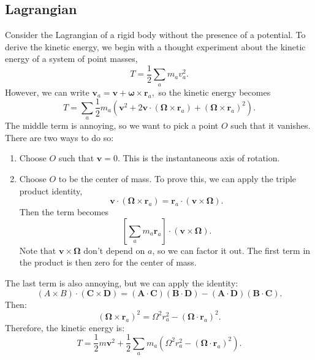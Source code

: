 \documentclass{article}
\numberwithin{equation}{section}
\begin{document}
\subsection{Lagrangian}
Consider the Lagrangian of a rigid body without the presence of a potential. To derive the kinetic energy, we begin with a thought experiment about the kinetic energy of a system of point masses,
\begin{equation}
    T = \frac{1}{2}\sum_a m_av_a^2.
\end{equation}
However, we can write $\bm{v}_a = \bm{v} + \bm{\omega} \times \bm{r}_a,$ so the kinetic energy becomes
\begin{equation}
    T = \sum_a \frac{1}{2}m_a\left(\bm{v}^2 + 2\bm{v}\cdot (\bm{\Omega} \times \bm{r}_a) + (\bm{\Omega} \times \bm{r}_a)^2\right).
\end{equation}
The middle term is annoying, so we want to pick a point $O$ such that it vanishes. There are two ways to do so:
\begin{enumerate}
    \item Choose $O$ such that $\bm{v}=0.$ This is the instantaneous axis of rotation.
    \item Choose $O$ to be the center of mass. To prove this, we can apply the triple product identity,
    \begin{equation}
        \bm{v} \cdot (\bm{\Omega} \times \bm{r}_a) = \bm{r}_a \cdot (\bm{v} \times \bm{\Omega}).
    \end{equation}
    Then the term becomes
    \begin{equation}
        \left[\sum_a m_a \bm{r}_a\right] \cdot (\bm{v}\times \bm{\Omega}).
    \end{equation}
    Note that $\bm{v}\times \bm{\Omega}$ don't depend on $a$, so we can factor it out. The first term in the product is then zero for the center of mass.
\end{enumerate}
The last term is also annoying, but we can apply the identity:
\begin{equation}
    (A \times B) \cdot (\bm{C} \times \bm{D}) = (\bm{A} \cdot \bm{C})(\bm{B}\cdot \bm{D}) - (\bm{A}\cdot \bm{D})(\bm{B}\cdot\bm{C}).
\end{equation}
Then:
\begin{equation}
    (\bm{\Omega} \times \bm{r}_a)^2 = \Omega^2 r_a^2 - (\bm{\Omega} \cdot \bm{r}_a)^2.
\end{equation}
Therefore, the kinetic energy is:
\begin{equation}
    T = \frac{1}{2}m\bm{v}^2 + \frac{1}{2}\sum_a m_a\left(\Omega^2r_a^2 - (\bm{\Omega}\cdot\bm{r}_a)^2\right).
\end{equation}
\end{document}
